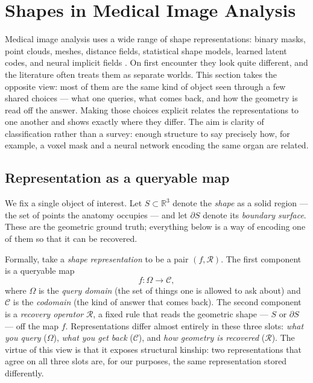 
\section{Shapes in Medical Image Analysis} %
\label{sec:bg-shapes}

Medical image analysis uses a wide range of shape representations: binary masks, point
clouds, meshes, distance fields, statistical shape models, learned latent codes, and
neural implicit fields \citep{heimann2009statistical, ambellan2019statistical}. On first
encounter they look quite different, and the literature often treats them as separate
worlds. This section takes the opposite view: most of them are the same kind of object
seen through a few shared choices --- what one queries, what comes back, and how the
geometry is read off the answer. Making those choices explicit relates the
representations to one another and shows exactly where they differ. The aim is clarity of
classification rather than a survey: enough structure to say precisely how, for example,
a voxel mask and a neural network encoding the same organ are related.

\subsection{Representation as a queryable map}
\label{sec:shape-frame}

We fix a single object of interest. Let $S \subset \mathbb{R}^3$ denote the
\emph{shape} as a solid region --- the set of points the anatomy occupies --- and let
$\partial S$ denote its \emph{boundary surface}. These are the geometric ground truth;
everything below is a way of encoding one of them so that it can be recovered.

Formally, take a \emph{shape representation} to be a pair $(f, \mathcal{R})$. The first
component is a queryable map
\[
    f : \Omega \longrightarrow \mathcal{C},
\]
where $\Omega$ is the \emph{query domain} (the set of things one is allowed to ask
about) and $\mathcal{C}$ is the \emph{codomain} (the kind of answer that comes back).
The second component is a \emph{recovery operator} $\mathcal{R}$, a fixed rule that
reads the geometric shape --- $S$ or $\partial S$ --- off the map $f$. Representations
differ almost entirely in these three slots: \emph{what you query} ($\Omega$),
\emph{what you get back} ($\mathcal{C}$), and \emph{how geometry is recovered}
($\mathcal{R}$). The virtue of this view is that it exposes structural kinship: two
representations that agree on all three slots are, for our purposes, the same
representation stored differently.

